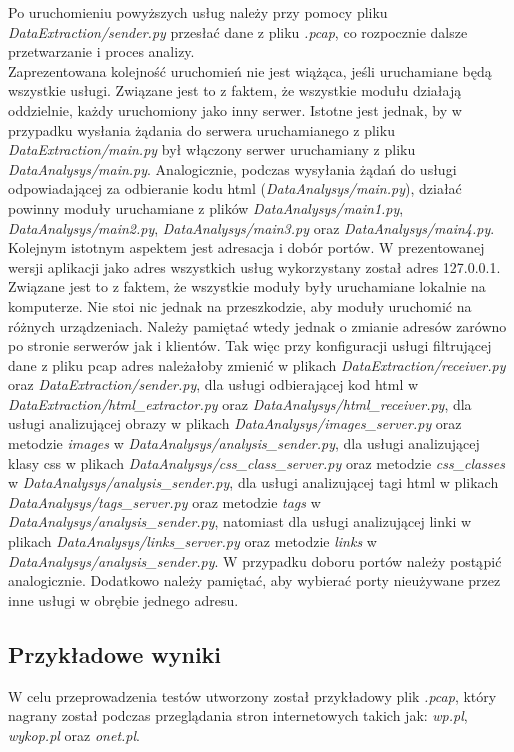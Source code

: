 \documentclass[12pt]{article}
\begin{document}
Po uruchomieniu powyższych usług należy przy pomocy pliku \emph{DataExtraction/sender.py} przesłać dane z pliku \emph{.pcap}, co rozpocznie dalsze przetwarzanie i proces analizy. \\
Zaprezentowana kolejność uruchomień nie jest wiążąca, jeśli uruchamiane będą wszystkie usługi. Związane jest to z faktem, że wszystkie modułu działają oddzielnie, każdy uruchomiony jako inny serwer. Istotne jest jednak, by w przypadku wysłania żądania do serwera uruchamianego z pliku \textit{DataExtraction/main.py} był włączony serwer uruchamiany z pliku \textit{DataAnalysys/main.py}. Analogicznie, podczas wysyłania żądań do usługi odpowiadającej za odbieranie kodu html (\textit{DataAnalysys/main.py}), działać powinny moduły uruchamiane z plików \textit{DataAnalysys/main1.py}, \textit{DataAnalysys/main2.py}, \textit{DataAnalysys/main3.py} oraz \textit{DataAnalysys/main4.py}.\\
Kolejnym istotnym aspektem jest adresacja i dobór portów. W prezentowanej wersji aplikacji jako adres wszystkich usług wykorzystany został adres 127.0.0.1. Związane jest to z faktem, że wszystkie moduły były uruchamiane lokalnie na komputerze. Nie stoi nic jednak na przeszkodzie, aby moduły uruchomić na różnych urządzeniach. Należy pamiętać wtedy jednak o zmianie adresów zarówno po stronie serwerów jak i klientów. Tak więc przy konfiguracji usługi filtrującej dane z pliku pcap adres należałoby zmienić w plikach \textit{DataExtraction/receiver.py} oraz \textit{DataExtraction/sender.py}, dla usługi odbierającej kod html w \textit{DataExtraction/html\_extractor.py} oraz \textit{DataAnalysys/html\_receiver.py}, dla usługi analizującej obrazy w plikach  \textit{DataAnalysys/images\_server.py} oraz metodzie \textit{images} w  \textit{DataAnalysys/analysis\_sender.py}, dla usługi analizującej klasy css w plikach  \textit{DataAnalysys/css\_class\_server.py} oraz metodzie \textit{css\_classes} w  \textit{DataAnalysys/analysis\_sender.py}, dla usługi analizującej tagi html w plikach  \textit{DataAnalysys/tags\_server.py} oraz metodzie \textit{tags} w  \textit{DataAnalysys/analysis\_sender.py}, natomiast dla usługi analizującej linki w plikach  \textit{DataAnalysys/links\_server.py} oraz metodzie \textit{links} w  \textit{DataAnalysys/analysis\_sender.py}. W przypadku doboru portów należy postąpić analogicznie. Dodatkowo należy pamiętać, aby wybierać porty nieużywane przez inne usługi w obrębie jednego adresu.

\subsection{Przykładowe wyniki}
W celu przeprowadzenia testów utworzony został przykładowy plik \emph{.pcap}, który nagrany został podczas przeglądania stron internetowych takich jak: \emph{wp.pl}, \emph{wykop.pl} oraz \emph{onet.pl}. 
\end{document}
